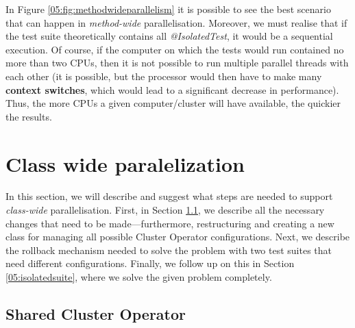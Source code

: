 In Figure \ref {05:fig:methodwideparallelism} it is possible to see the best scenario that can happen in \emph {method-wide} parallelisation.
Moreover, we must realise that if the test suite theoretically contains all \emph{@IsolatedTest}, it would be a sequential execution.
Of course, if the computer on which the tests would run contained no more than two CPUs, then it is not possible to run multiple parallel threads with each other (it is possible, but the processor would then have to make many \textbf{context switches}, which would lead to a significant decrease in performance).
Thus, the more CPUs a given computer/cluster will have available, the quickier the results.

\section{Class wide paralelization}
\label{04:classwideparalelisation}

In this section, we will describe and suggest what steps are needed to support \emph{class-wide} parallelisation.
First, in Section \ref{05:sharedclusteroperator}, we describe all the necessary changes that need to be made—furthermore, restructuring and creating a new class for managing all possible Cluster Operator configurations.
Next, we describe the rollback mechanism needed to solve the problem with two test suites that need different configurations.
Finally, we follow up on this in Section \ref{05:isolatedsuite}, where we solve the given problem completely.

\subsection{Shared Cluster Operator}
\label{05:sharedclusteroperator}


